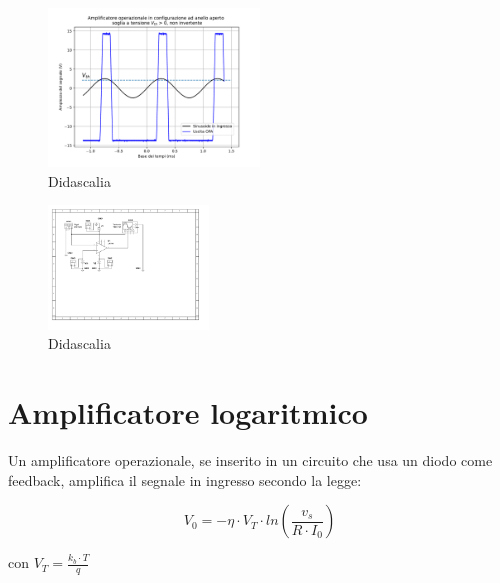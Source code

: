 \documentclass[journal]{IEEEtran}
\begin{document}
\begin{figure}[H]%
\begin{center}
\includegraphics[width=0.50\textwidth]{analysis/output/OPA-open-loop-biased_threshold.pdf}
\caption{Didascalia}
\label{fig:biased_scope}
\end{center}
\end{figure}


\begin{figure}[H]%
\begin{center}
\includegraphics[width=0.38\textwidth]{sch-simulations/output/OPA-biased.pdf}
\caption{Didascalia}
\label{fig:biased}
\end{center}
\end{figure}


\section{Amplificatore logaritmico} %

Un amplificatore operazionale, se inserito in un circuito che usa un diodo come feedback, amplifica il segnale in ingresso secondo la legge:

\begin{equation}
V_0 = - \eta \cdot V_T \cdot ln( \frac{v_s}{R \cdot I_0} )
\end{equation}

con $V_T = \frac{k_{b} \cdot T}{q}$ \\
\end{document}
